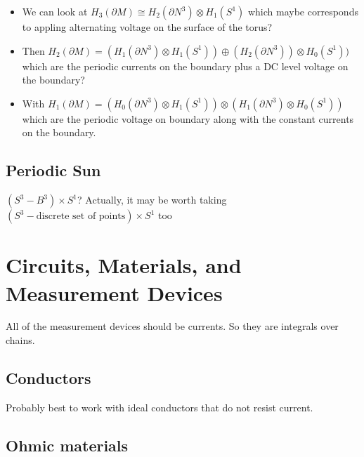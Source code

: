 \documentclass{article}
\begin{document}
\begin{itemize}
    \item We can look at $H_3(\partial M) \cong H_2(\partial N^3)\otimes H_1(S^1)$ which maybe corresponds to appling alternating voltage on the surface of the torus?
    \item Then $H_2(\partial M) = (H_1(\partial N^3) \otimes H_1(S^1)) \oplus (H_2(\partial N^3)) \otimes H_0(S^1))$ which are the periodic currents on the boundary plus a DC level voltage on the boundary?
    \item With $H_1(\partial M) = (H_0(\partial N^3) \otimes H_1(S^1))\otimes (H_1(\partial N^3) \otimes H_0(S^1))$ which are the periodic voltage on boundary along with the constant currents on the boundary.
\end{itemize}



\subsection{Periodic Sun}

$(S^3-B^3)\times S^1$? Actually, it may be worth taking $(S^3-\textrm{discrete set of points})\times S^1$ too


\section{Circuits, Materials, and Measurement Devices}
All of the measurement devices should be currents. So they are integrals over chains.


\subsection{Conductors}

Probably best to work with ideal conductors that do not resist current.

\subsection{Ohmic materials}
\end{document}
